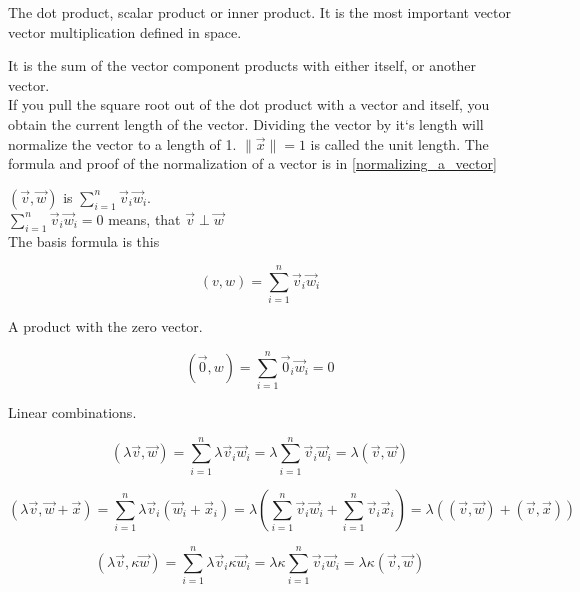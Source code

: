 \documentclass[a4paper]{article}
\begin{document}
The dot product, scalar product or inner product.
It is the most important vector vector multiplication defined in space.

It is the sum of the vector component products with either itself, or another vector.\\

If you pull the square root out of the dot product with a vector and itself, you obtain the current length of the vector.
Dividing the vector by it`s length will normalize the vector to a length of 1. $\|\vec{x}\| = 1$ is called the unit length.
The formula and proof of the normalization of a vector is in \ref{normalizing_a_vector}

$(\vec{v}, \vec{w})$ is $\sum_{i=1}^{n}\vec{v}_{i}\vec{w}_{i}$.  \\

$\sum_{i=1}^{n}\vec{v}_{i}\vec{w}_{i} = 0$ means, that $\vec{v} \perp \vec{w}$ \\

The basis formula is this

\begin{displaymath}
    (v,w) = \sum_{i=1}^{n}\vec{v}_{i}\vec{w}_{i}
\end{displaymath}

A product with the zero vector.

\begin{displaymath}
    (\vec{0},w) = \sum_{i=1}^{n}\vec{0}_{i}\vec{w}_{i} = 0
\end{displaymath}

Linear combinations.

\begin{displaymath}
    (\lambda\vec{v},\vec{w}) = \sum_{i=1}^{n}\lambda\vec{v}_{i}\vec{w}_{i}
    = \lambda\sum_{i=1}^{n}\vec{v}_{i}\vec{w}_{i} = \lambda(\vec{v}, \vec{w})
\end{displaymath}

\begin{displaymath}
    (\lambda\vec{v},\vec{w}+\vec{x}) = \sum_{i=1}^{n}\lambda\vec{v}_{i}(\vec{w}_{i}+\vec{x}_{i})
    = \lambda(\sum_{i=1}^{n}\vec{v}_{i}\vec{w}_{i}+\sum_{i=1}^{n}\vec{v}_{i}\vec{x}_{i})
    = \lambda((\vec{v},\vec{w})+(\vec{v},\vec{x}))
\end{displaymath}

\begin{displaymath}
    (\lambda\vec{v},\kappa\vec{w}) = \sum_{i=1}^{n}\lambda\vec{v}_{i}\kappa\vec{w}_{i}
    = \lambda\kappa\sum_{i=1}^{n}\vec{v}_{i}\vec{w}_{i} = \lambda\kappa(\vec{v}, \vec{w})
\end{displaymath}
\end{document}
